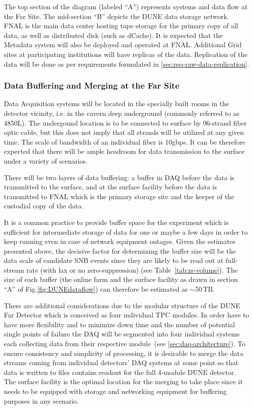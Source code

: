 \noindent
The top section of the diagram (labeled ``A'') represents systems and data flow at the Far Site.
The mid-section ``B'' depicts the DUNE data storage network. FNAL is the main data center
hosting tape storage for the primary copy of all data, as well as distributed disk (such as dCache).
It is expected that the Metadata system will also be deployed and operated at FNAL.
Additional Grid sites at participating institutions will have replicas of the data.
Replication of the data will be done as per requirements formulated in \ref{sec:req-raw-data-replication}.

\subsubsection{Data Buffering and Merging at the Far Site}
Data Acquisition systems will be located in the specially built rooms in the detector vicinity,
i.e. in the cavern deep underground (commonly referred to as 4850L). The undergound location is to be
connected to surface by 96-strand fiber optic cable, but this does not imply that all strands will be
utilized at any given time. The scale of bandwidth of an individual fiber is 10gbps. It can be therefore
expected that there will be ample headroom for data transmission to the surface under a variety of scenarios.

There will be two layers of data buffering: a buffer in DAQ before the data is transmitted to the surface,
and at the surface facility before the data is transmitted to FNAL which is the primary storage site and the
keeper of the custodial copy of the data.

It is a common practice to provide buffer space for the experiment which is sufficient for intermediate storage of data
for one or maybe a few days in order to keep running even in case of network equipment outages. Given the estimates
presented above, the decisive factor for determining the buffer size will be the data scale of candidate SNB events since
they are likely to be read out at full-stream rate (with lax or no zero-suppression) (see Table~\ref{tab:zs-volume}). The
size of each buffer (the online farm and the surface facility as drawn in section ``A'' of Fig.\ref{fig:DUNEdataflow})
can therefore be estimated as $\sim$50\,TB.

There are additional considerations due to the modular structure of the DUNE Far Detector
which is conceived as four individual TPC modules. In order have to have more flexibility and to minimize down time
and the number of potential single points of failure the DAQ will be segmented into four individual  systems each collecting
data from their respective module~(see \ref{sec:daq-architecture}). To ensure
consistency and simplicity of processing, it is desirable to merge the data streams coming from individual
detectors' DAQ systems at some point so that data is written to files contains readout for the full 4-module
DUNE detector. The surface facility is the optimal location for the merging to take place since it needs to be
equipped with storage and networking equipment for buffering purposes in any scenario.

